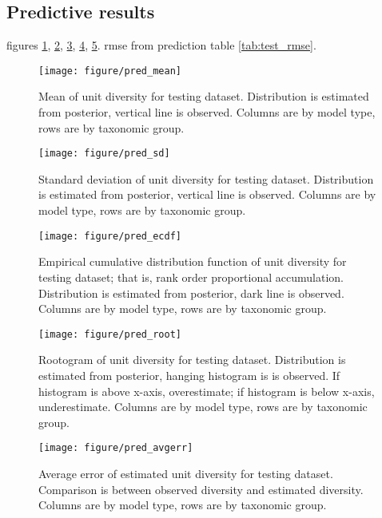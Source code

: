 \documentclass[12pt,letterpaper]{article}
\begin{document}
\subsection{Predictive results}
figures \ref{fig:pred_mean}, \ref{fig:pred_sd}, \ref{fig:pred_ecdf}, \ref{fig:pred_root}, \ref{fig:pred_avgerr}. rmse from prediction table \ref{tab:test_rmse}.

\afterpage{\clearpage}
\begin{figure}[h]
  \centering
  \texttt{[image: figure/pred\_mean]}
  \caption{Mean of unit diversity for testing dataset. Distribution is estimated from posterior, vertical line is observed. Columns are by model type, rows are by taxonomic group.}
  \label{fig:pred_mean}
\end{figure}

\begin{figure}[h]
  \afterpage{\clearpage}
  \centering
  \texttt{[image: figure/pred\_sd]}
  \caption{Standard deviation of unit diversity for testing dataset. Distribution is estimated from posterior, vertical line is observed. Columns are by model type, rows are by taxonomic group.}
  \label{fig:pred_sd}
\end{figure}

\afterpage{\clearpage}
\begin{figure}[h]
  \centering
  \texttt{[image: figure/pred\_ecdf]}
  \caption{Empirical cumulative distribution function of unit diversity for testing dataset; that is, rank order proportional accumulation. Distribution is estimated from posterior, dark line is observed. Columns are by model type, rows are by taxonomic group.}
  \label{fig:pred_ecdf}
\end{figure}

\afterpage{\clearpage}
\begin{figure}[h]
  \centering
  \texttt{[image: figure/pred\_root]}
  \caption{Rootogram of unit diversity for testing dataset. Distribution is estimated from posterior, hanging histogram is is observed. If histogram is above x-axis, overestimate; if histogram is below x-axis, underestimate. Columns are by model type, rows are by taxonomic group.}
  \label{fig:pred_root}
\end{figure}

\afterpage{\clearpage}
\begin{figure}[h]
  \centering
  \texttt{[image: figure/pred\_avgerr]}
  \caption{Average error of estimated unit diversity for testing dataset. Comparison is between observed diversity and estimated diversity. Columns are by model type, rows are by taxonomic group.}
  \label{fig:pred_avgerr}
\end{figure}
\end{document}
